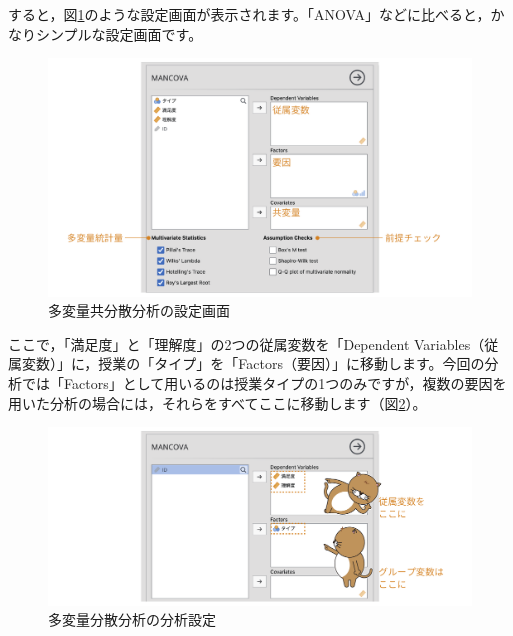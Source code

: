 \documentclass[
  12pt,
  a5jpaper,
  lualatex, ja=standard]{bxjsbook}
\begin{document}
すると，図\ref{fig:ANOVA-mancova-settings}のような設定画面が表示されます。「ANOVA」などに比べると，かなりシンプルな設定画面です。

\begin{figure}[!ht]

{\centering \includegraphics[width=1\linewidth]{images/ANOVA/mancova-settings} 

}

\caption{多変量共分散分析の設定画面}\label{fig:ANOVA-mancova-settings}
\end{figure}

ここで，「満足度」と「理解度」の2つの従属変数を「Dependent Variables（従属変数）」に，授業の「タイプ」を「Factors（要因）」に移動します。今回の分析では「Factors」として用いるのは授業タイプの1つのみですが，複数の要因を用いた分析の場合には，それらをすべてここに移動します（図\ref{fig:ANOVA-mancova-set-var}）。

\begin{figure}[!ht]

{\centering \includegraphics[width=1\linewidth]{images/ANOVA/mancova-set-var} 

}

\caption{多変量分散分析の分析設定}\label{fig:ANOVA-mancova-set-var}
\end{figure}
\end{document}
